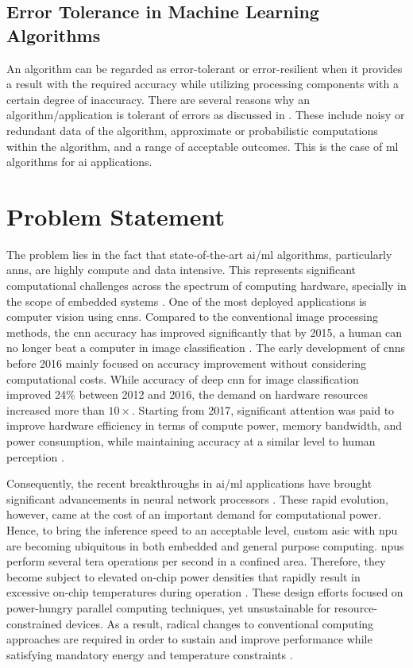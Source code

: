 \subsection{Error Tolerance in Machine Learning Algorithms}
An algorithm can be regarded as error-tolerant or error-resilient when it provides a result with the required accuracy while utilizing processing components with a certain degree of inaccuracy. There are several reasons why an algorithm/application is tolerant of errors as discussed in \cite{chippa2013analysis}. These include noisy or redundant data of the algorithm, approximate or probabilistic computations within the algorithm, and a range of acceptable outcomes. This is the case of \gls{ml} algorithms for \gls{ai} applications.

\section{Problem Statement}
The problem lies in the fact that state-of-the-art \gls{ai}/\gls{ml} algorithms, particularly \gls{ann}s, are highly compute and data intensive. This represents significant computational challenges across the spectrum of computing hardware, specially in the scope of embedded systems \cite{venkataramani2016efficient}. One of the most deployed applications is computer vision using \gls{cnn}s. Compared to the conventional image processing methods, the \gls{cnn} accuracy has improved significantly that by 2015, a human can no longer beat a computer in image classification \cite{loh20201}. The early development of \gls{cnn}s before 2016 mainly focused on accuracy improvement without considering computational costs. While accuracy of deep \gls{cnn} for image classification improved 24\% between 2012 and 2016, the demand on hardware resources increased more than $10\times$. Starting from 2017, significant attention was paid to improve hardware efficiency in terms of compute power, memory bandwidth, and power consumption, while maintaining accuracy at a similar level to human perception \cite{venkataramani2016efficient}.

Consequently, the recent breakthroughs in \gls{ai}/\gls{ml} applications have brought significant advancements in neural network processors \cite{jouppi2017datacenter}. These rapid evolution, however, came at the cost of an important demand for computational power. Hence, to bring the inference speed to an acceptable level, custom \gls{asic} with \gls{npu} are becoming ubiquitous in both embedded and general purpose computing. \gls{npu}s perform several tera operations per second in a confined area. Therefore, they become subject to elevated on-chip power densities that rapidly result in excessive on-chip temperatures during operation \cite{amrouch2020npu}.
These design efforts focused on power-hungry parallel computing techniques, yet unsustainable for resource-constrained devices.
As a result, radical changes to conventional computing approaches are required in order to sustain and improve performance while satisfying mandatory energy and temperature constraints \cite{gillani2020exploiting}.

